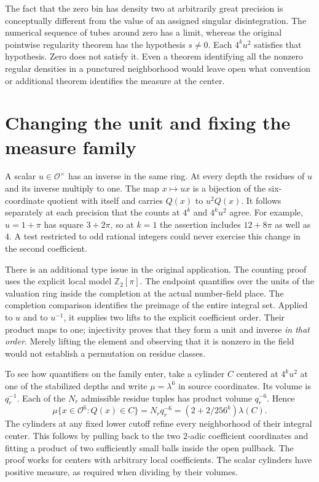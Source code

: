 \documentclass[12pt,letterpaper]{article}
\begin{document}
The fact that the zero bin has density two at arbitrarily great precision is conceptually different from the value of an assigned singular disintegration. The numerical sequence of tubes around zero has a limit, whereas the original pointwise regularity theorem has the hypothesis $s\ne0$. Each $4^ku^2$ satisfies that hypothesis. Zero does not satisfy it. Even a theorem identifying all the nonzero regular densities in a punctured neighborhood would leave open what convention or additional theorem identifies the measure at the center.

\section{Changing the unit and fixing the measure family}
A scalar $u\in\mathcal O^\times$ has an inverse in the same ring. At every depth the residues of $u$ and its inverse multiply to one. The map $x\mapsto ux$ is a bijection of the six-coordinate quotient with itself and carries $Q(x)$ to $u^2Q(x)$. It follows separately at each precision that the counts at $4^k$ and $4^ku^2$ agree. For example, $u=1+\pi$ has square $3+2\pi$, so at $k=1$ the assertion includes $12+8\pi$ as well as $4$. A test restricted to odd rational integers could never exercise this change in the second coefficient.

There is an additional type issue in the original application. The counting proof uses the explicit local model $\mathbb Z_2[\pi]$. The endpoint quantifies over the units of the valuation ring inside the completion at the actual number-field place. The completion comparison identifies the preimage of the entire integral set. Applied to $u$ and to $u^{-1}$, it supplies two lifts to the explicit coefficient order. Their product maps to one; injectivity proves that they form a unit and inverse \emph{in that order}. Merely lifting the element and observing that it is nonzero in the field would not establish a permutation on residue classes.

To see how quantifiers on the family enter, take a cylinder $C$ centered at $4^ku^2$ at one of the stabilized depths and write $\mu=\lambda^6$ in source coordinates. Its volume is $q_r^{-1}$. Each of the $N_r$ admissible residue tuples has product volume $q_r^{-6}$. Hence
\[
   \mu\{x\in\mathcal O^6:Q(x)\in C\}
     =N_r q_r^{-6}
     =(2+2/256^k)\lambda(C).
\]
The cylinders at any fixed lower cutoff refine every neighborhood of their integral center. This follows by pulling back to the two $2$-adic coefficient coordinates and fitting a product of two sufficiently small balls inside the open pullback. The proof works for centers with arbitrary local coefficients. The scalar cylinders have positive measure, as required when dividing by their volumes.
\end{document}

